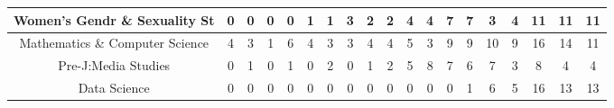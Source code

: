 \documentclass[10]{article}
\begin{document}
\begin{landscape}
\begin{longtable}[c]{|ccccccccccccccccccc|}
	\multicolumn{1}{|c|}{Women's Gendr \& Sexuality St}              & \multicolumn{1}{c|}{0}          & \multicolumn{1}{c|}{0}          & \multicolumn{1}{c|}{0}          & \multicolumn{1}{c|}{0}          & \multicolumn{1}{c|}{1}          & \multicolumn{1}{c|}{1}          & \multicolumn{1}{c|}{3}          & \multicolumn{1}{c|}{2}          & \multicolumn{1}{c|}{2}          & \multicolumn{1}{c|}{4}          & \multicolumn{1}{c|}{4}          & \multicolumn{1}{c|}{7}          & \multicolumn{1}{c|}{7}          & \multicolumn{1}{c|}{3}          & \multicolumn{1}{c|}{4}          & \multicolumn{1}{c|}{11}         & \multicolumn{1}{c|}{11}         & 11         \\ \hline
	\multicolumn{1}{|c|}{Mathematics \& Computer Science}            & \multicolumn{1}{c|}{4}          & \multicolumn{1}{c|}{3}          & \multicolumn{1}{c|}{1}          & \multicolumn{1}{c|}{6}          & \multicolumn{1}{c|}{4}          & \multicolumn{1}{c|}{3}          & \multicolumn{1}{c|}{3}          & \multicolumn{1}{c|}{4}          & \multicolumn{1}{c|}{4}          & \multicolumn{1}{c|}{5}          & \multicolumn{1}{c|}{3}          & \multicolumn{1}{c|}{9}          & \multicolumn{1}{c|}{9}          & \multicolumn{1}{c|}{10}         & \multicolumn{1}{c|}{9}          & \multicolumn{1}{c|}{16}         & \multicolumn{1}{c|}{14}         & 11         \\ \hline
	\multicolumn{1}{|c|}{Pre-J:Media Studies}                        & \multicolumn{1}{c|}{0}          & \multicolumn{1}{c|}{1}          & \multicolumn{1}{c|}{0}          & \multicolumn{1}{c|}{1}          & \multicolumn{1}{c|}{0}          & \multicolumn{1}{c|}{2}          & \multicolumn{1}{c|}{0}          & \multicolumn{1}{c|}{1}          & \multicolumn{1}{c|}{2}          & \multicolumn{1}{c|}{5}          & \multicolumn{1}{c|}{8}          & \multicolumn{1}{c|}{7}          & \multicolumn{1}{c|}{6}          & \multicolumn{1}{c|}{7}          & \multicolumn{1}{c|}{3}          & \multicolumn{1}{c|}{8}          & \multicolumn{1}{c|}{4}          & 4          \\ \hline
	\multicolumn{1}{|c|}{Data Science}                               & \multicolumn{1}{c|}{0}          & \multicolumn{1}{c|}{0}          & \multicolumn{1}{c|}{0}          & \multicolumn{1}{c|}{0}          & \multicolumn{1}{c|}{0}          & \multicolumn{1}{c|}{0}          & \multicolumn{1}{c|}{0}          & \multicolumn{1}{c|}{0}          & \multicolumn{1}{c|}{0}          & \multicolumn{1}{c|}{0}          & \multicolumn{1}{c|}{0}          & \multicolumn{1}{c|}{0}          & \multicolumn{1}{c|}{1}          & \multicolumn{1}{c|}{6}          & \multicolumn{1}{c|}{5}          & \multicolumn{1}{c|}{16}         & \multicolumn{1}{c|}{13}         & 13         \\ \hline

\end{longtable}
\end{landscape}
\end{document}
